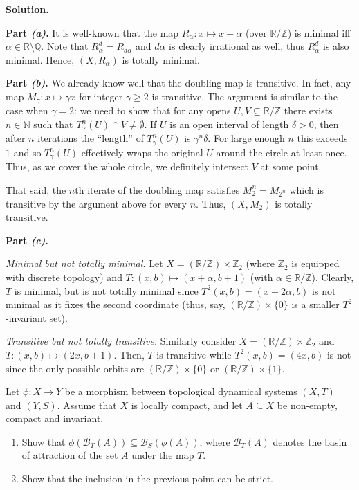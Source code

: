 \documentclass{template}
\begin{document}
\textbf{Solution.}

\textcolor{blue!70!black}{\textbf{Part \textit{(a)}.}} It is well-known that the
map $R_{\alpha}: x \mapsto x+\alpha$ (over $\mathbb{R}/\mathbb{Z}$) is minimal
iff $\alpha \in \mathbb{R}\setminus \mathbb{Q}$. Note that
$R_{\alpha}^d=R_{d\alpha}$ and $d\alpha$ is clearly irrational as well, thus
$R_{\alpha}^d$ is also minimal. Hence, $(X,R_{\alpha})$ is totally minimal. 

\textcolor{blue!70!black}{\textbf{Part \textit{(b)}.}} We already know well that
the doubling map is transitive. In fact, any map $M_{\gamma}: x \mapsto \gamma
x$ for integer $\gamma \geq 2$ is transitive. The argument is similar to the
case when $\gamma=2$: we need to show that for any opens $U,V \subseteq
\mathbb{R}/\mathbb{Z}$ there exists $n \in \mathbb{N}$ such that
$T_{\gamma}^n(U) \cap V \neq \emptyset$. If $U$ is an open interval of length 
$\delta>0$, then after $n$ iterations the ``length'' of $T_{\gamma}^n(U)$ is 
$\gamma^n\delta$. For large enough $n$ this exceeds $1$ and so $T_{\gamma}^n(U)$
effectively wraps the original $U$ around the circle at least once. Thus,
as we cover the whole circle, we definitely intersect $V$ at some point.

That said, the $n$th iterate of the doubling map satisfies $M_2^n=M_{2^n}$ which
is transitive by the argument above for every $n$. Thus, $(X,M_2)$ is totally
transitive.

\textcolor{blue!70!black}{\textbf{Part \textit{(c)}.}}

\textit{Minimal but not totally minimal.} Let $X=(\mathbb{R}/\mathbb{Z}) \times
\mathbb{Z}_2$ (where $\mathbb{Z}_2$ is equipped with discrete topology) and $T:
(x,b) \mapsto (x+\alpha,b+1)$ (with $\alpha \in \mathbb{R}/\mathbb{Z}$).
Clearly, $T$ is minimal, but is not totally minimal since
$T^2(x,b)=(x+2\alpha,b)$ is not minimal as it fixes the second coordinate (thus,
say, $(\mathbb{R}/\mathbb{Z}) \times \{0\}$ is a smaller $T^2$-invariant set).

\textit{Transitive but not totally transitive.} Similarly consider
$X=(\mathbb{R}/\mathbb{Z}) \times \mathbb{Z}_2$ and $T: (x,b) \mapsto (2x,b+1)$.
Then, $T$ is transitive while $T^2(x,b)=(4x,b)$ is not since the only possible
orbits are $(\mathbb{R}/\mathbb{Z}) \times \{0\}$ or $(\mathbb{R}/\mathbb{Z})
\times \{1\}$.

\newpage

\begin{problem}[Exercise 5]
    Let $\phi: X \to Y$ be a morphism between topological dynamical systems 
    $(X,T)$ and $(Y,S)$. Assume that $X$ is locally compact, and let $A \subseteq X$
    be non-empty, compact and invariant.
    \begin{enumerate}
        \item[(a)] Show that $\phi(\mathcal{B}_T(A)) \subseteq \mathcal{B}_S(\phi(A))$,
        where $\mathcal{B}_T(A)$ denotes the basin of attraction of the set $A$ under 
        the map $T$.
        \item[(b)] Show that the inclusion in the previous point can be strict.
    \end{enumerate}
\end{problem}
\end{document}
